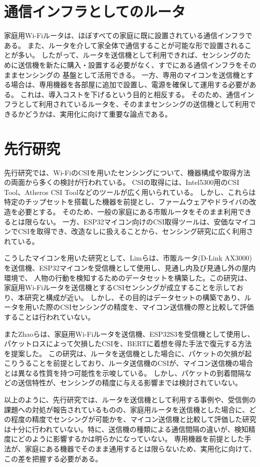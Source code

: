 \documentclass[uplatex, 12pt]{ujbook}
\begin{document}
\section{通信インフラとしてのルータ}
家庭用Wi-Fiルータは、ほぼすべての家庭に既に設置されている通信インフラである。
また、ルータを介して家全体で通信することが可能な形で設置されることが多い。
したがって、ルータを送信機として利用できれば、センシングのために送信機を新たに購入・設置する必要がなく、すでにある通信インフラをそのままセンシングの
基盤として活用できる。
一方、専用のマイコンを送信機とする場合は、専用機器を各部屋に追加で設置し、電源を確保して運用する必要がある。
これは、導入コストを下げるという目的と相反する。
そのため、通信インフラとして利用されているルータを、そのままセンシングの送信機として利用できるかどうかは、実用化に向けて重要な論点である。
\section{先行研究}
先行研究では、Wi-FiのCSIを用いたセンシングについて、機器構成や取得方法の両面から多くの検討が行われている。
CSIの取得には、Intel5300用のCSI Tool、Atheros CSI Toolなどのツールが広く用いられている。
しかし、これらは特定のチップセットを搭載した機器を前提とし、ファームウェアやドライバの改造を必要とする。
そのため、一般の家庭にある市販ルータをそのまま利用できるとは限らない。
一方、ESP32マイコン向けのCSI取得ツールは、安価なマイコンでCSIを取得でき、改造なしに扱えることから、センシング研究に広く利用されている。


こうしたマイコンを用いた研究として、Limらは、市販ルータ(D-Link AX3000)を送信機、ESP32マイコンを受信機として使用し、見通し内及び見通し外の屋内環境で、
人物の行動を検知するためのデータセットを構築した。この研究は、家庭用Wi-Fiルータを送信機とするCSIセンシングが成立することを示しており、本研究と構成が近い。
しかし、その目的はデータセットの構築であり、ルータを用いた際のCSIセンシングの精度を、マイコン送信機の際と比較して評価することは行われていない\cite{lim}。


またZhaoらは、家庭用Wi-Fiルータを送信機、ESP32S3を受信機として使用し、パケットロスによって欠損したCSIを、BERTに着想を得た手法で復元する方法を提案した。
この研究は、ルータを送信機とした場合に、パケットの欠損が起こりうることを前提としており、ルータ送信機のCSIが、マイコン送信機の場合とは異なる性質を持つ可能性を示唆している。
しかし、パケットの到着間隔などの送信特性が、センシングの精度に与える影響までは検討されていない\cite{zhao}。

以上のように、先行研究では、ルータを送信機として利用する事例や、受信側の課題への対処が報告されているものの、家庭用ルータを送信機とした場合に、どの程度の精度でセンシングが可能かを、マイコン送信機と比較して評価した研究は十分に行われていない。特に、送信機の種類による通信間隔の違いが、検知精度にどのように影響するかは明らかになっていない。
専用機器を前提とした手法が、家庭にある機器でそのまま通用するとは限らないため、実用化に向けて、この差を把握する必要がある。
\end{document}
